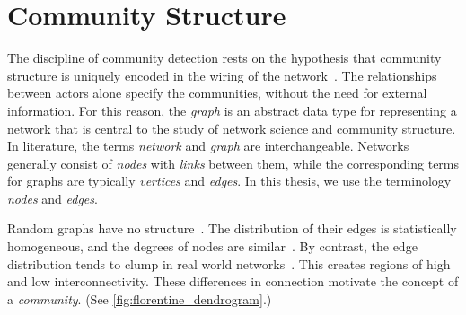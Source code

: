 \section{Community Structure}

The discipline of community detection rests on the hypothesis that community structure is uniquely encoded in the wiring of the network~\cite{barabasi2016network}. The relationships between actors alone specify the communities, without the need for external information. For this reason, the \emph{graph} is an abstract data type for representing a network that is central to the study of network science and community structure. In literature, the terms \emph{network} and \emph{graph} are interchangeable. Networks generally consist of \emph{nodes} with \emph{links} between them, while the corresponding terms for graphs are typically \emph{vertices} and \emph{edges}. In this thesis, we use the terminology \emph{nodes} and \emph{edges}.

Random graphs have no structure~\cite{barabasi2016network}. The distribution of their edges is statistically homogeneous, and the degrees of nodes are similar~\cite{erdos1959random}. By contrast, the edge distribution tends to clump in real world networks~\cite{fortunato2010community}. This creates regions of high and low interconnectivity. These differences in connection motivate the concept of a \emph{community}. (See \autoref{fig:florentine_dendrogram}.)

